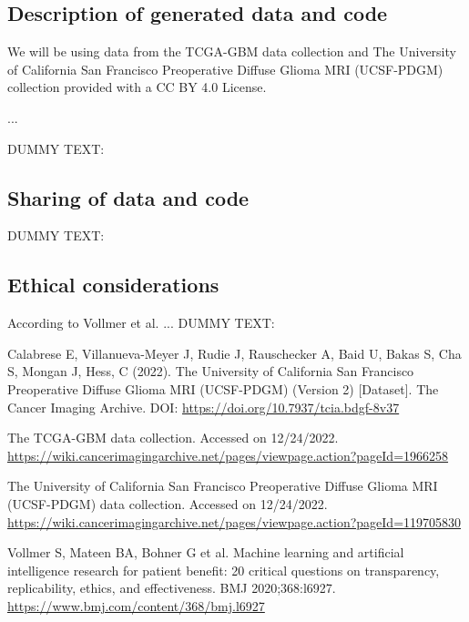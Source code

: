 \documentclass[11pt]{article}
\begin{document}
\subsection{Description of generated data and code}

We will be using data from the TCGA-GBM data collection \cite{TCGA-GBM} and The University of California San Francisco Preoperative Diffuse Glioma MRI (UCSF-PDGM) collection \cite{UCSF-PDGM,Calabrese2022} provided with a CC BY 4.0 License.

...

DUMMY TEXT:
\lipsum[8]

\subsection{Sharing of data and code}

DUMMY TEXT:
\lipsum[9]

\subsection{Ethical considerations}

According to Vollmer et al. \cite{Vollmer2020} ...
DUMMY TEXT:
\lipsum[10]


\begin{footnotesize}
\begin{thebibliography}{2}

 Calabrese E, Villanueva-Meyer J, Rudie J, Rauschecker A, Baid U, Bakas S, Cha S, Mongan J, Hess, C (2022). The University of California San Francisco Preoperative Diffuse Glioma MRI (UCSF-PDGM) (Version 2) [Dataset].  The Cancer Imaging Archive.  DOI: \scriptsize{\url{https://doi.org/10.7937/tcia.bdgf-8v37}}

 The TCGA-GBM data collection. Accessed on 12/24/2022.\\ \scriptsize{\url{https://wiki.cancerimagingarchive.net/pages/viewpage.action?pageId=1966258}}

 The University of California San Francisco Preoperative Diffuse Glioma MRI (UCSF-PDGM) data collection. Accessed on 12/24/2022.\\ 
\scriptsize{\url{https://wiki.cancerimagingarchive.net/pages/viewpage.action?pageId=119705830}}

 Vollmer S, Mateen BA, Bohner G et al. Machine learning and artificial intelligence research for patient benefit: 20 critical questions on transparency, replicability, ethics, and effectiveness. BMJ 2020;368:l6927. \\
\scriptsize{\url{https://www.bmj.com/content/368/bmj.l6927}}


\end{thebibliography}
\end{footnotesize}
\end{document}
